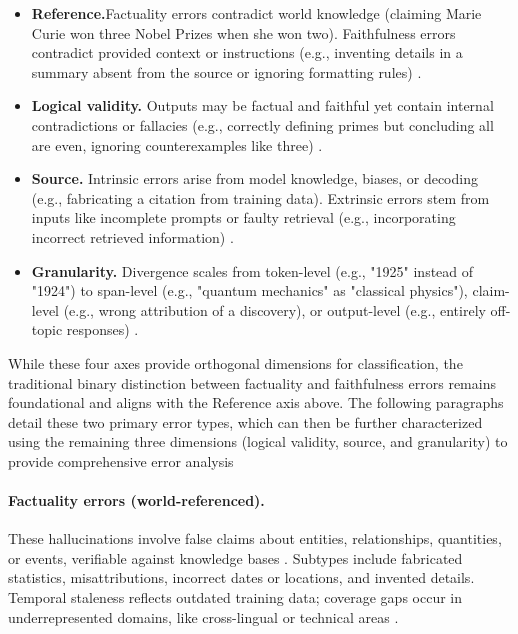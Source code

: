 \documentclass{llncs}
\begin{document}
\begin{itemize}
\item \textbf{Reference.}Factuality errors contradict world knowledge (claiming Marie Curie won three Nobel Prizes when she won two). Faithfulness errors contradict provided context or instructions (e.g., inventing details in a summary absent from the source or ignoring formatting rules) \cite{ji2023hallucination,huang2025survey,zhang2023siren}.
\item \textbf{Logical validity.} Outputs may be factual and faithful yet contain internal contradictions or fallacies (e.g., correctly defining primes but concluding all are even, ignoring counterexamples like three) \cite{huang2025survey,jiang2024survey}.

\item \textbf{Source.} Intrinsic errors arise from model knowledge, biases, or decoding (e.g., fabricating a citation from training data). Extrinsic errors stem from inputs like incomplete prompts or faulty retrieval (e.g., incorporating incorrect retrieved information) \cite{ji2023hallucination,zhang2023siren}.

\item \textbf{Granularity.} Divergence scales from token-level (e.g., "1925" instead of "1924") to span-level (e.g., "quantum mechanics" as "classical physics"), claim-level (e.g., wrong attribution of a discovery), or output-level (e.g., entirely off-topic responses) \cite{huang2025survey}.
\end{itemize}

While these four axes provide orthogonal dimensions for classification, the traditional binary distinction between factuality and faithfulness errors remains foundational and aligns with the Reference axis above. The following paragraphs detail these two primary error types, which can then be further characterized using the remaining three dimensions (logical validity, source, and granularity) to provide comprehensive error analysis

\paragraph{Factuality errors (world-referenced).} These hallucinations involve false claims about entities, relationships, quantities, or events, verifiable against knowledge bases \cite{ji2023hallucination,huang2025survey}. Subtypes include fabricated statistics, misattributions, incorrect dates or locations, and invented details. Temporal staleness reflects outdated training data; coverage gaps occur in underrepresented domains, like cross-lingual or technical areas \cite{kasai2024realtimeqa}.
\end{document}
